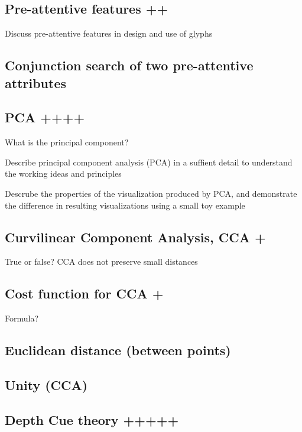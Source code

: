 \documentclass[a4paper]{article}
\begin{document}
\subsection{Pre-attentive features ++}



Discuss pre-attentive features in design and use of glyphs

\subsection{Conjunction search of two pre-attentive attributes}

\subsection{PCA ++++}

What is the principal component?

Describe principal component analysis (PCA) in a suffient detail to understand the working ideas and principles

Descrube the properties of the visualization produced by PCA, and demonstrate the difference in resulting visualizations using a small toy example

\subsection{Curvilinear Component Analysis, CCA +}

True or false? CCA does not preserve small distances

\subsection{Cost function for CCA +}

Formula?

\subsection{Euclidean distance (between points)}

\subsection{Unity (CCA)}

\subsection{Depth Cue theory +++++}
\end{document}
